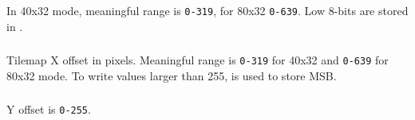 \subsubsection{}



\subsubsection{}

\begin{NextPort}
\end{NextPort}

In 40x32 mode, meaningful range is {\tt 0-319}, for 80x32 {\tt 0-639}. Low 8-bits are stored in .


\subsubsection{}

\begin{NextPort}
\end{NextPort}

Tilemap X offset in pixels. Meaningful range is {\tt 0-319} for 40x32 and {\tt 0-639} for 80x32 mode. To write values larger than 255,  is used to store MSB.


\subsubsection{}

\begin{NextPort}
\end{NextPort}

Y offset is {\tt 0-255}.


\subsubsection{}
\vspace*{-2ex}
\subsubsection{}
\vspace*{-2ex}

